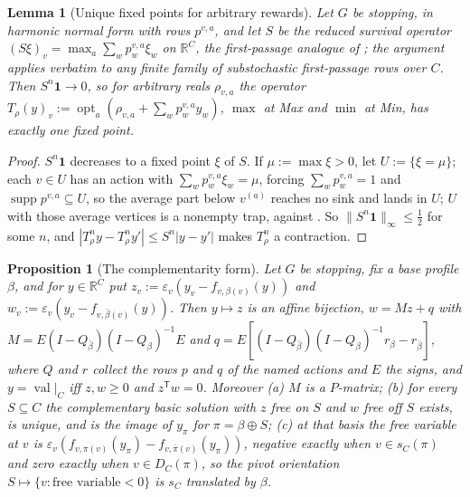 \documentclass[11pt]{article}
\theoremstyle{plain}
\newtheorem{lemma}[theorem]{Lemma}
\newtheorem{proposition}[theorem]{Proposition}
\theoremstyle{definition}
\DeclareMathOperator{\val}{val}
\newcommand{\bbone}{\mathbf{1}}
\begin{document}
\begin{lemma}[Unique fixed points for arbitrary rewards]\label{lem:survival-contract}
Let $G$ be stopping, in harmonic normal form with rows $p^{v,a}$, and let
$S$ be the reduced survival operator
$(S\xi)_v=\max_a\sum_wp^{v,a}_w\xi_w$ on $\mathbb R^{C}$, the first-passage
analogue of ; the argument applies verbatim to any
finite family of substochastic first-passage rows over $C$. Then
$S^{n}\bbone\to0$, so for arbitrary reals $\rho_{v,a}$ the operator
$T_\rho(y)_v:=\operatorname{opt}_a(\rho_{v,a}+\sum_wp^{v,a}_wy_w)$, $\max$
at Max and $\min$ at Min, has exactly one fixed point.
\end{lemma}

\begin{proof}
$S^{n}\bbone$ decreases to a fixed point $\xi$ of $S$. If
$\mu:=\max\xi>0$, let $U:=\{\xi=\mu\}$; each $v\in U$ has an action with
$\sum_wp^{v,a}_w\xi_w=\mu$, forcing $\sum_wp^{v,a}_w=1$ and
$\operatorname{supp}p^{v,a}\subseteq U$, so the average part below
$v^{(a)}$ reaches no sink and lands in $U$; $U$ with those average
vertices is a nonempty trap, against . So
$\|S^{n}\bbone\|_\infty\le\tfrac12$ for some $n$, and
$|T_\rho^{n}y-T_\rho^{n}y'|\le S^{n}|y-y'|$ makes $T_\rho^{n}$ a
contraction.
\end{proof}

\begin{proposition}[The complementarity form]\label{prop:lcp}
Let $G$ be stopping, fix a base profile $\beta$, and for $y\in\mathbb R^{C}$
put $z_v:=\varepsilon_v(y_v-f_{v,\beta(v)}(y))$ and
$w_v:=\varepsilon_v(y_v-f_{v,\bar\beta(v)}(y))$. Then $y\mapsto z$ is an
affine bijection, $w=Mz+q$ with
$M=E(I-Q_{\bar\beta})(I-Q_\beta)^{-1}E$ and
$q=E[(I-Q_{\bar\beta})(I-Q_\beta)^{-1}r_\beta-r_{\bar\beta}]$, where $Q$
and $r$ collect the rows $p$ and $q$ of the named actions and $E$ the
signs, and $y=\val|_C$ iff $z,w\ge0$ and $z^{\mathsf T}w=0$. Moreover
(a) $M$ is a $P$-matrix; (b) for every $S\subseteq C$ the complementary
basic solution with $z$ free on $S$ and $w$ free off $S$ exists, is
unique, and is the image of $y_\pi$ for $\pi=\beta\oplus S$; (c) at that
basis the free variable at $v$ is
$\varepsilon_v(f_{v,\pi(v)}(y_\pi)-f_{v,\bar\pi(v)}(y_\pi))$, negative
exactly when $v\in s_C(\pi)$ and zero exactly when $v\in D_C(\pi)$, so the
pivot orientation $S\mapsto\{v:\text{free variable}<0\}$ is $s_C$
translated by $\beta$.
\end{proposition}
\end{document}
